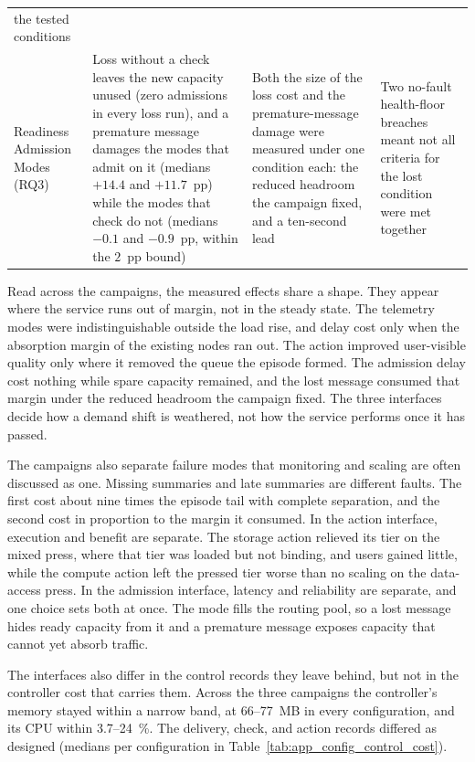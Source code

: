 ﻿\documentclass[12pt,reqno,twoside]{amsbook}
\begin{document}
\begin{table}[H]
\begin{tabular}{p{} p{} p{} p{}}
        the tested conditions \\
        Readiness Admission Modes (RQ3) & Loss without a check leaves
        the new capacity unused (zero admissions in every loss run), and a
        premature message damages the modes that admit on it (medians
        $+14.4$ and $+11.7$~pp) while the modes that check do not (medians
        $-0.1$ and $-0.9$~pp, within the $2$~pp bound) & Both the size of the
        loss cost and the premature-message damage were measured under one
        condition each: the reduced headroom the campaign fixed, and a
        ten-second lead & Two no-fault health-floor breaches meant not all
        criteria for the lost condition were met together \\
        \bottomrule
    \end{tabular}
\end{table}

Read across the campaigns, the measured effects share a shape. They appear
where the service runs out of margin, not in the steady state. The telemetry
modes were indistinguishable outside the load rise, and delay cost only when the
absorption margin of the existing nodes ran out. The action improved
user-visible quality only where it removed the queue the episode formed. The
admission delay cost nothing while spare capacity remained, and the lost message
consumed that margin under the reduced headroom the campaign fixed. The three
interfaces decide how a demand shift is weathered, not how the service performs
once it has passed.

The campaigns also separate failure modes that monitoring and scaling are often
discussed as one. Missing summaries and late summaries are different faults.
The first cost about nine times the episode tail with complete separation, and
the second cost in proportion to the margin it consumed. In the action
interface, execution and benefit are separate. The storage action relieved its
tier on the mixed press, where that tier was loaded but not binding, and users
gained little, while the compute action left the pressed tier worse than no
scaling on the data-access press. In the admission interface, latency and
reliability are separate, and one choice sets both at once. The mode fills the
routing pool, so a lost message hides ready capacity from it and a premature
message exposes capacity that cannot yet absorb traffic.

The interfaces also differ in the control records they leave behind, but not
in the controller cost that carries them. Across the three campaigns the
controller's memory stayed within a narrow band, at 66--77~MB in every
configuration, and its CPU within 3.7--24~\%. The delivery,
check, and action records differed as designed (medians per configuration in
Table~\ref{tab:app_config_control_cost}).
\end{document}
